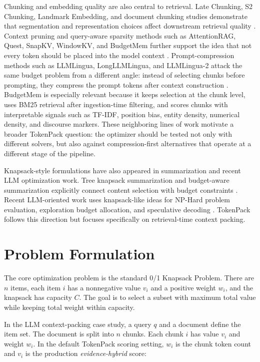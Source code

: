 \documentclass[conference]{IEEEtran}
\begin{document}
Chunking and embedding quality are also central to retrieval. Late Chunking, S2 Chunking, Landmark Embedding, and document chunking studies demonstrate that segmentation and representation choices affect downstream retrieval quality \cite{gunther2024latechunking,verma2025s2chunking,luo2024landmark,luo2024bge,documentchunking2026}. Context pruning and query-aware sparsity methods such as AttentionRAG, Quest, SnapKV, WindowKV, and BudgetMem further support the idea that not every token should be placed into the model context \cite{attentionrag2025,tang2024quest,li2024snapkv,zuo2025windowkv,budgetmem2025}. Prompt-compression methods such as LLMLingua, LongLLMLingua, and LLMLingua-2 attack the same budget problem from a different angle: instead of selecting chunks before prompting, they compress the prompt tokens after context construction \cite{jiang2023llmlingua,jiang2024longllmlingua,pan2024llmlingua2}. BudgetMem is especially relevant because it keeps selection at the chunk level, uses BM25 retrieval after ingestion-time filtering, and scores chunks with interpretable signals such as TF-IDF, position bias, entity density, numerical density, and discourse markers. These neighboring lines of work motivate a broader TokenPack question: the optimizer should be tested not only with different solvers, but also against compression-first alternatives that operate at a different stage of the pipeline.

Knapsack-style formulations have also appeared in summarization and recent LLM optimization work. Tree knapsack summarization and budget-aware summarization explicitly connect content selection with budget constraints \cite{hirao2013treeknapsack,pilault2022factorizing}. Recent LLM-oriented work uses knapsack-like ideas for NP-Hard problem evaluation, exploration budget allocation, and speculative decoding \cite{duchnowski2025knapsack,li2025knapsackrl,cha2026knapspec}. TokenPack follows this direction but focuses specifically on retrieval-time context packing.

\section{Problem Formulation}
The core optimization problem is the standard 0/1 Knapsack Problem. There are $n$ items, each item $i$ has a nonnegative value $v_i$ and a positive weight $w_i$, and the knapsack has capacity $C$. The goal is to select a subset with maximum total value while keeping total weight within capacity.

In the LLM context-packing case study, a query $q$ and a document define the item set. The document is split into $n$ chunks. Each chunk $i$ has value $v_i$ and weight $w_i$. In the default TokenPack scoring setting, $w_i$ is the chunk token count and $v_i$ is the production \textit{evidence-hybrid} score:
\end{document}
